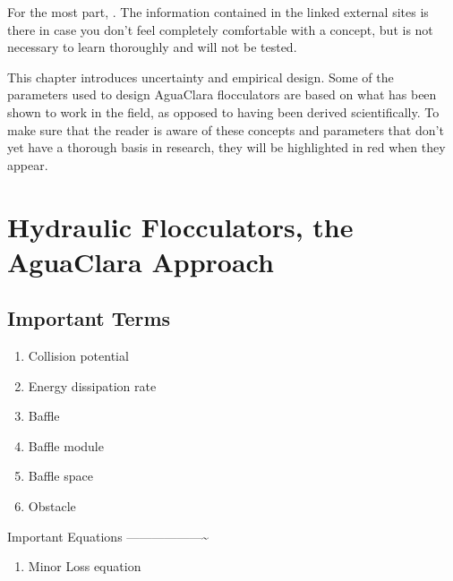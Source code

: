 \documentclass[letterpaper,10pt,english]{sphinxmanual}
\begin{document}
For the most part, . The information contained in the linked external sites is there in case you don’t feel completely comfortable with a concept, but is not necessary to learn thoroughly and will not be tested.

 This chapter introduces uncertainty and empirical design. Some of the parameters used to design AguaClara flocculators are based on what has been shown to work in the field, as opposed to having been derived scientifically. To make sure that the reader is aware of these concepts and parameters that don’t yet have a thorough basis in research, they will be highlighted in red when they appear.


\section{Hydraulic Flocculators, the AguaClara Approach}
\label{\detokenize{Flocculation/Floc_Design:hydraulic-flocculators-the-aguaclara-approach}}

\subsection{Important Terms}
\label{\detokenize{Flocculation/Floc_Design:important-terms}}\begin{enumerate}
\item {} 
Collision potential

\item {} 
Energy dissipation rate

\item {} 
Baffle

\item {} 
Baffle module

\item {} 
Baffle space

\item {} 
Obstacle

\end{enumerate}

Important Equations
——————\textasciitilde{}
\begin{enumerate}
\item {} 
Minor Loss equation

\end{enumerate}
\end{document}
